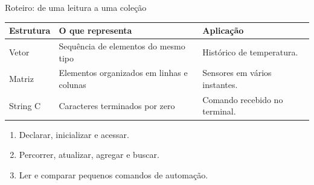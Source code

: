 \begin{frame}{Roteiro: de uma leitura a uma coleção}
\begin{tabularx}{\textwidth}{l>{\raggedright\arraybackslash}X>{\raggedright\arraybackslash}X}
\toprule
Estrutura & O que representa & Aplicação \\
\midrule
Vetor & Sequência de elementos do mesmo tipo & Histórico de temperatura. \\
Matriz & Elementos organizados em linhas e colunas & Sensores em vários instantes. \\
String C & Caracteres terminados por zero & Comando recebido no terminal. \\
\bottomrule
\end{tabularx}
\vspace{0.35cm}
\begin{enumerate}
\item Declarar, inicializar e acessar.
\item Percorrer, atualizar, agregar e buscar.
\item Ler e comparar pequenos comandos de automação.
\end{enumerate}
\end{frame}
